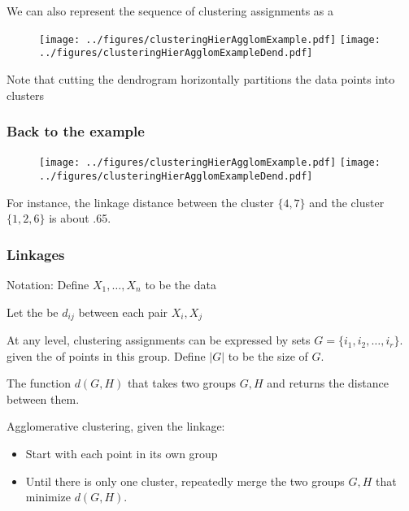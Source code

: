 \documentclass{beamer}
\begin{document}
\begin{frame}
We can also represent the sequence of clustering assignments as a 
\begin{figure}[h!]
  \centering
  \texttt{[image: ../figures/clusteringHierAgglomExample.pdf]}
  \texttt{[image: ../figures/clusteringHierAgglomExampleDend.pdf]}  
\end{figure}
Note that cutting the dendrogram horizontally partitions the data points into clusters
\end{frame}



\begin{frame}
\frametitle{Back to the example}
\begin{figure}[h!]
  \centering
  \texttt{[image: ../figures/clusteringHierAgglomExample.pdf]}
  \texttt{[image: ../figures/clusteringHierAgglomExampleDend.pdf]}  
\end{figure}
For instance, the linkage distance between the cluster $\{4,7\}$ and the cluster $\{1,2,6\}$ is about .65.
\end{frame}

\begin{frame}
\frametitle{Linkages}
Notation: Define $X_1,\ldots, X_n$ to be the data

\vsp
Let the  be $d_{ij}$ between each pair $X_i, X_j$

\vsp
At any level, clustering assignments can be expressed by sets $G = \{ i_1, i_2, \ldots, i_r\}$. given the 
of points in this group.  Define $|G|$ to be the size of $G$.  

\vsp
{}  The function $d(G,H)$ that takes two groups $G,H$ and returns the  distance between them.

\vsp 
Agglomerative clustering, given the linkage:
\begin{itemize}
\item Start with each point in its own group
\item Until there is only one cluster, repeatedly merge the two groups $G,H$ that minimize $d(G,H)$.
\end{itemize}
\end{frame}
\end{document}

